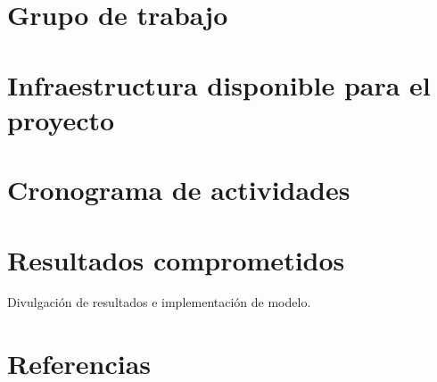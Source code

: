 \documentclass[12pt,letterpaper,draft,titlepage]{article}
\begin{document}
\maketitle

\tableofcontents





\section {Grupo de trabajo}

\section {Infraestructura disponible para el proyecto}

\section {Cronograma de actividades}

\section {Resultados comprometidos}
Divulgación de resultados e implementación de modelo.

\newpage
\section {Referencias}
\printbibliography[heading=none]
\end{document}
